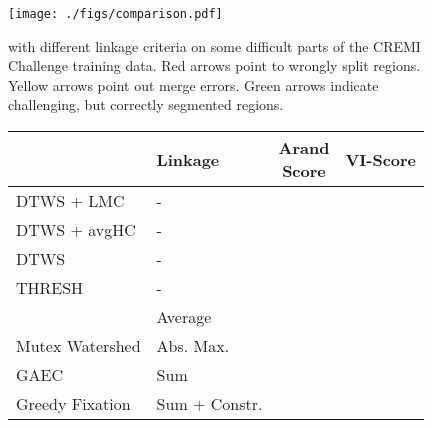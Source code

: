 
\begin{figure}[t]
\centering
\texttt{[image: ./figs/comparison.pdf]} %
\caption{\algname{} with different linkage criteria on some difficult parts of the CREMI Challenge \cite{cremiChallenge} training data. Red arrows point to wrongly split regions. Yellow arrows point out merge errors. Green arrows indicate challenging, but correctly segmented regions. 
\label{fig:cremi_comparison}}
\end{figure}
\begin{figure}
        \centering
\begin{minipage}[T]{0.48\textwidth}
    \centering
    \scriptsize
        \begin{tabular}{l|l|c|c}
         & \algname{} Linkage & \makecell{Arand\\Score} & VI-Score \\ \midrule
DTWS + LMC \cite{beier2016efficient}& -& & \\
DTWS + avgHC &-& & \\
DTWS  & -& & \\
THRESH &-& & \\ \hline
\algname{} & Average& & \\
Mutex Watershed \cite{wolf2018mutex} & Abs. Max.  & & \\
GAEC \cite{keuper2015efficient} & Sum & & \\
Greedy Fixation \cite{levinkov2017comparative} & Sum + Constr.  & & \\
        \end{tabular}
    \label{tab:results_cremi_train}

\end{minipage}
\end{figure}
